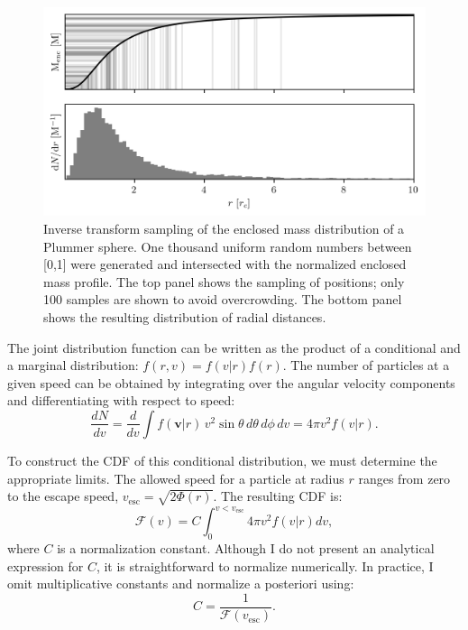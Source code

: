             \begin{figure}
                \includegraphics[width=\linewidth]{images/inverse_transform_sampling_distances.png}
                \caption{Inverse transform sampling of the enclosed mass distribution of a Plummer sphere. One thousand uniform random numbers between [0,1] were generated and intersected with the normalized enclosed mass profile. The top panel shows the sampling of positions; only 100 samples are shown to avoid overcrowding. The bottom panel shows the resulting distribution of radial distances.}
                \label{fig:inverse_transform_sampling_distances}
            \end{figure}

            The joint distribution function can be written as the product of a conditional and a marginal distribution: $f(r,v) = f(v|r) f(r)$. The number of particles at a given speed can be obtained by integrating over the angular velocity components and differentiating with respect to speed:
            \begin{equation}
                \frac{dN}{dv} = \frac{d}{dv} \int f(\textbf{v}|r)\, v^2 \sin\theta\, d\theta\, d\phi\, dv = 4\pi v^2 f(v|r).
            \end{equation}

            To construct the CDF of this conditional distribution, we must determine the appropriate limits. The allowed speed for a particle at radius $r$ ranges from zero to the escape speed, $v_{\mathrm{esc}} = \sqrt{2\Phi(r)}$. The resulting CDF is:
            \begin{equation}
                \mathcal{F}(v) = C \int_0^{v < v_\mathrm{esc}} 4\pi v^2 f(v|r) dv,
            \end{equation}
            where $C$ is a normalization constant. Although I do not present an analytical expression for $C$, it is straightforward to normalize numerically. In practice, I omit multiplicative constants and normalize a posteriori using:
            \begin{equation}
                C = \frac{1}{\mathcal{F}(v_\mathrm{esc})}.
            \end{equation}

